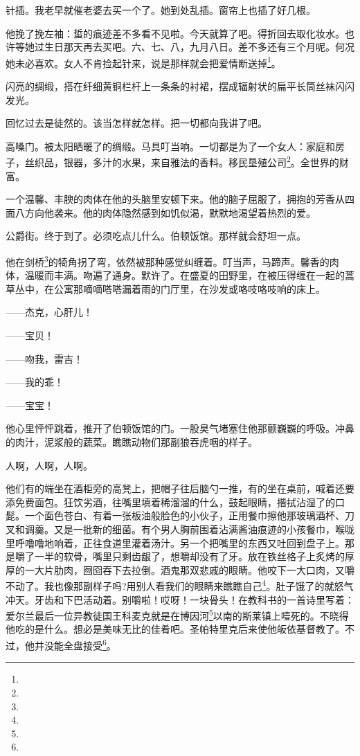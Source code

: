 \par 针插。我老早就催老婆去买一个了。她到处乱插。窗帘上也插了好几根。
\par 他挽了挽左袖：蜇的痕迹差不多看不见啦。今天就算了吧。得折回去取化妆水。也许等她过生日那天再去买吧。六、七、八，九月八日。差不多还有三个月呢。何况她未必喜欢。女人不肯捡起针来，说是那样就会把爱情断送掉\footnote{}。
\par 闪亮的绸缎，搭在纤细黄铜栏杆上一条条的衬裙，摆成辐射状的扁平长筒丝袜闪闪发光。
\par 回忆过去是徒然的。该当怎样就怎样。把一切都向我讲了吧。
\par 高嗓门。被太阳晒暖了的绸缎。马具叮当响。一切都是为了一个女人：家庭和房子，丝织品，银器，多汁的水果，来自雅法的香料。移民垦殖公司\footnote{}。全世界的财富。
\par 一个温馨、丰腴的肉体在他的头脑里安顿下来。他的脑子屈服了，拥抱的芳香从四面八方向他袭来。他的肉体隐然感到如饥似渴，默默地渴望着热烈的爱。
\par 公爵街。终于到了。必须吃点儿什么。伯顿饭馆。那样就会舒坦一点。
\par 他在剑桥\footnote{}的犄角拐了弯，依然被那种感觉纠缠着。叮当声，马蹄声。馨香的肉体，温暖而丰满。吻遍了通身。默许了。在盛夏的田野里，在被压得缠在一起的蒿草丛中，在公寓那嘀嘀嗒嗒漏着雨的门厅里，在沙发或咯吱咯吱响的床上。
\par ——杰克，心肝儿！
\par ——宝贝！
\par ——吻我，雷吉！
\par ——我的乖！
\par ——宝宝！
\par 他心里怦怦跳着，推开了伯顿饭馆的门。一股臭气堵塞住他那颤巍巍的呼吸。冲鼻的肉汁，泥浆般的蔬菜。瞧瞧动物们那副狼吞虎咽的样子。
\par 人啊，人啊，人啊。
\par 他们有的端坐在酒柜旁的高凳上，把帽子往后脑勺一推，有的坐在桌前，喊着还要添免费面包。狂饮劣酒，往嘴里填着稀溜溜的什么，鼓起眼睛，揩拭沾湿了的口髭。一个面色苍白、有着一张板油般脸色的小伙子，正用餐巾擦他那玻璃酒杯、刀叉和调羹。又是一批新的细菌。有个男人胸前围着沾满酱油痕迹的小孩餐巾，喉咙里呼噜噜地响着，正往食道里灌着汤汁。另一个把嘴里的东西又吐回到盘子上。那是嚼了一半的软骨，嘴里只剩齿龈了，想嚼却没有了牙。放在铁丝格子上炙烤的厚厚的一大片肋肉，囫囵吞下去拉倒。酒鬼那双悲戚的眼睛。他咬下一大口肉，又嚼不动了。我也像那副样子吗?用别人看我们的眼睛来瞧瞧自己\footnote{}。肚子饿了的就怒气冲天。牙齿和下巴活动着。别嚼啦！哎呀！一块骨头！在教科书的一首诗里写着：爱尔兰最后一位异教徒国王科麦克就是在博因河\footnote{}以南的斯莱镇上噎死的。不晓得他吃的是什么。想必是美味无比的佳肴吧。圣帕特里克后来使他皈依基督教了。不过，他并没能全盘接受\footnote{}。
